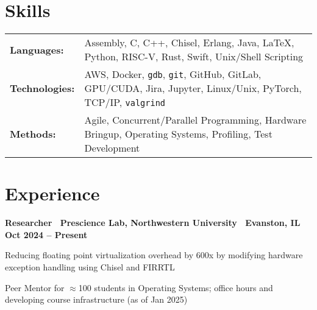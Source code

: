\documentclass[10pt]{article}
\newenvironment{mylist}[1][]
{\itemize[nosep, wide=0pt, leftmargin=*, after=\strut]}
{\enditemize}
\begin{document}

\section{Skills}
\begin{tabularx}{\linewidth}{@{}l X@{}}
    \textbf{Languages:} & Assembly, C, C++, Chisel, Erlang, Java, \LaTeX, Python, RISC-V, Rust, Swift, Unix/Shell Scripting \\
    \textbf{Technologies:} & AWS, Docker, \texttt{gdb}, \texttt{git}, GitHub, GitLab, GPU/CUDA, Jira, Jupyter, Linux/Unix, PyTorch, TCP/IP, \texttt{valgrind} \\
    \textbf{Methods:} & Agile, Concurrent/Parallel Programming, Hardware Bringup, Operating Systems, Profiling, Test Development
\end{tabularx}


\section{Experience}
\begin{minipage}[t]{\linewidth}
    \textbf{Researcher \textbar \ Prescience Lab, Northwestern University \textbar \ Evanston, IL} \hfill \textbf{Oct 2024 -- Present} 
    \begin{mylist}
        \item Reducing floating point virtualization overhead by 600x by modifying hardware exception handling using Chisel and FIRRTL
        \item Peer Mentor for $\approx$100 students in Operating Systems; office hours and developing course infrastructure (as of Jan 2025)
    \end{mylist}
\end{minipage}
\end{document}
